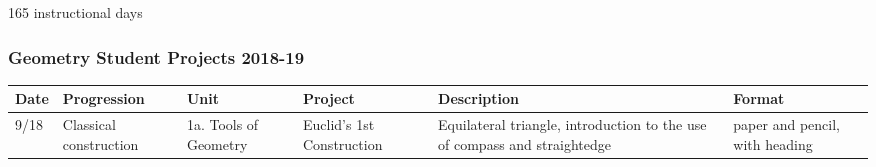 \documentclass[12pt, twoside]{article}
\begin{document}
165 instructional days

\newpage
\subsubsection*{Geometry Student Projects 2018-19}

\begin{tabular}{|p{1cm}|p{2.5cm}|p{3cm}|p{4cm}|p{8cm}|p{4cm}|}
  \hline
  Date & Progression & Unit & Project & Description & Format \\
  \hline
  9/18 & Classical construction & 1a. Tools of Geometry & Euclid's 1st Construction & Equilateral triangle, introduction to the use of compass and straightedge & paper and pencil, with heading \\
  \hline
\end{tabular}
\end{document}

